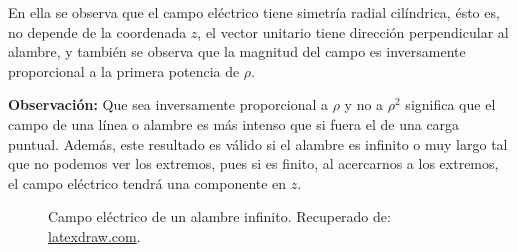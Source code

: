 En ella se observa que el campo eléctrico tiene simetría radial cilíndrica, ésto es, no depende de la coordenada $z$, el vector unitario tiene dirección perpendicular al alambre, y también se observa que la magnitud del campo es inversamente proporcional a la primera potencia de $\rho$.

\textbf{Observación:} Que sea inversamente proporcional a $\rho$ y no a $\rho^2$ significa que el campo de una línea o alambre es más intenso que si fuera el de una carga puntual. Además, este resultado es válido si el alambre es infinito o muy largo tal que no podemos ver los extremos, pues si es finito, al acercarnos a los extremos, el campo eléctrico tendrá una componente en $z$.

\begin{figure}[H]
\centering
\resizebox{12.5cm}{7cm}{%

}
\caption{Campo eléctrico de un alambre infinito. Recuperado de: \href{https://latexdraw.com/electric-field-of-line-charge-in-tikz/}{latexdraw.com}.}
\end{figure}

